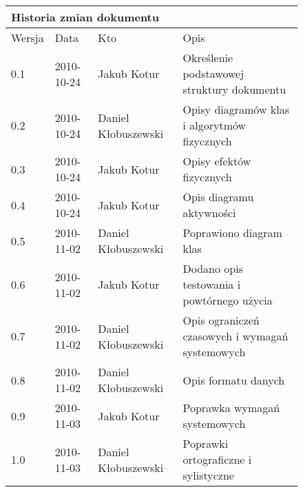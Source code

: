 \begin{figure}[h]
	\centering

\begin{tabular}{|p{}|p{}|p{}|p{}|}
	\hline
	\multicolumn{4}{|l|}{Historia zmian dokumentu} \\
	\hline
	Wersja & Data & Kto & Opis \\
	\hline
	0.1 & 2010-10-24 & Jakub Kotur &
	Określenie podstawowej struktury dokumentu \\
	\hline
	0.2 & 2010-10-24 & Daniel Kłobuszewski &
	Opisy diagramów klas i algorytmów fizycznych \\
	\hline
	0.3 & 2010-10-24 & Jakub Kotur &
	Opisy efektów fizycznych \\
	\hline
	0.4 & 2010-10-24 & Jakub Kotur &
	Opis diagramu aktywności \\
	\hline
	0.5 & 2010-11-02 & Daniel Kłobuszewski &
	Poprawiono diagram klas \\
	\hline
	0.6 & 2010-11-02 & Jakub Kotur &
	Dodano opis testowania i powtórnego użycia \\
	\hline
	0.7 & 2010-11-02 & Daniel Kłobuszewski &
	Opis ograniczeń czasowych i wymagań systemowych \\
	\hline
	0.8 & 2010-11-02 & Daniel Kłobuszewski &
	Opis formatu danych \\
	\hline
	0.9 & 2010-11-03 & Jakub Kotur &
	Poprawka wymagań systemowych \\
	\hline
	1.0 & 2010-11-03 & Daniel Kłobuszewski &
	Poprawki ortograficzne i sylistyczne \\
	\hline
\end{tabular}

	\label{tab:metric}
\end{figure}

